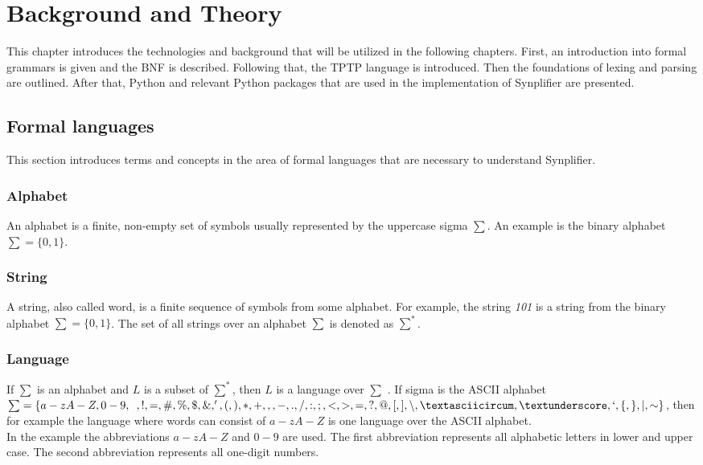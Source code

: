 
\chapter{Background and Theory}\label{cha:Background}

This chapter introduces the technologies and background that will be utilized in the following chapters. First, an introduction into formal grammars is given and the \acf{BNF} is described. Following that, the \ac{TPTP} language is introduced. Then the foundations of lexing and parsing are outlined. After that, Python and relevant Python packages that are used in the implementation of \ac{Synplifier} are presented.

\section{Formal languages}\label{sec:BackgroundFormalLanguage}

This section introduces terms and concepts in the area of formal languages that are necessary to understand \ac{Synplifier}.

\subsection{Alphabet}
An alphabet is a finite, non-empty set of symbols usually represented by the uppercase sigma $\sum$.
An example is the binary alphabet $\sum = \{0,1\}$. \cite{AutomataTheory.2007}

\subsection{String}
A string, also called word, is a finite sequence of symbols from some alphabet. For example, the string \textit{101} is a string from the binary alphabet $\sum = \{0,1\}$.
The set of all strings over an alphabet $\sum$ is denoted as $\sum ^{*}$. \cite{AutomataTheory.2007}

\subsection{Language}
If $\sum$ is an alphabet and $L$ is a subset of $\sum ^*$, then $L$ is a language over $\sum$ \cite{AutomataTheory.2007}.
If sigma is the \ac{ASCII} alphabet $\sum = \{a-zA-Z,0-9,\enspace,!,=,\#,\%,\$,\&,',(,),*,+,,,-,.,/,:,;,<,>,=,?,@,[,],\backslash ,\textasciicircum ,\textunderscore ,`,\{,\},\mid,\sim\}$, then for example the language where words can consist of $a-zA-Z$ is one language over the \ac{ASCII} alphabet.\\
In the example the abbreviations $a-zA-Z$ and $0-9$ are used. The first abbreviation represents all alphabetic letters in lower and upper case. The second abbreviation represents all one-digit numbers.

